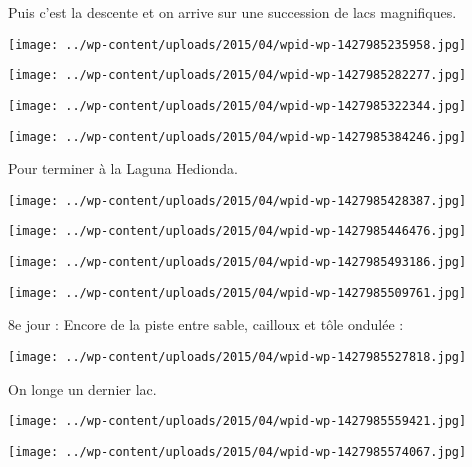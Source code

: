  Puis c'est la descente et on arrive sur une succession de lacs magnifiques. \newline
 \newline
\centerline{\texttt{[image: ../wp-content/uploads/2015/04/wpid-wp-1427985235958.jpg]} } 
 \newline
 \newline
\centerline{\texttt{[image: ../wp-content/uploads/2015/04/wpid-wp-1427985282277.jpg]} } 
 \newline
 \newline
\centerline{\texttt{[image: ../wp-content/uploads/2015/04/wpid-wp-1427985322344.jpg]} } 
 \newline
 \newline
\centerline{\texttt{[image: ../wp-content/uploads/2015/04/wpid-wp-1427985384246.jpg]} } 
 \newline
 Pour terminer à la Laguna Hedionda. \newline
 \newline
\centerline{\texttt{[image: ../wp-content/uploads/2015/04/wpid-wp-1427985428387.jpg]} } 
 \newline
 \newline
\centerline{\texttt{[image: ../wp-content/uploads/2015/04/wpid-wp-1427985446476.jpg]} } 
 \newline
 \newline
\centerline{\texttt{[image: ../wp-content/uploads/2015/04/wpid-wp-1427985493186.jpg]} } 
 \newline
 \newline
\centerline{\texttt{[image: ../wp-content/uploads/2015/04/wpid-wp-1427985509761.jpg]} } 
 \newline
 8e jour : \newline
 Encore de la piste entre sable, cailloux et tôle ondulée : \newline
 \newline
\centerline{\texttt{[image: ../wp-content/uploads/2015/04/wpid-wp-1427985527818.jpg]} } 
 \newline
 On longe un dernier lac. \newline
 \newline
\centerline{\texttt{[image: ../wp-content/uploads/2015/04/wpid-wp-1427985559421.jpg]} } 
 \newline
 \newline
\centerline{\texttt{[image: ../wp-content/uploads/2015/04/wpid-wp-1427985574067.jpg]} } 
